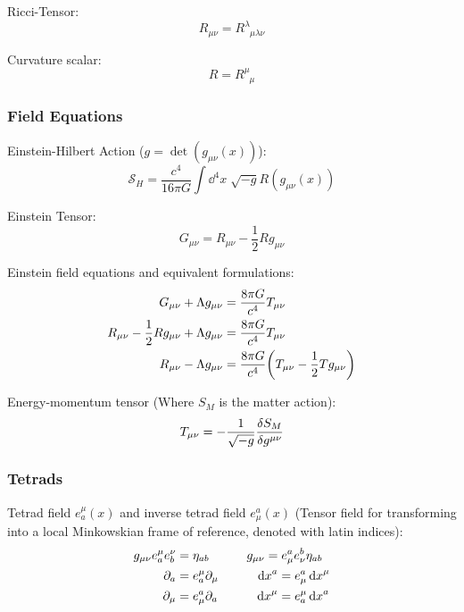 			\noindent
			Ricci-Tensor:
			\begin{equation}
				R_{\mu\nu} = R^\lambda_{\phantom{\lambda}\mu\lambda\nu}
			\end{equation}

			\noindent
			Curvature scalar:
			\begin{equation}
				R = R^\mu_{\phantom{\mu}\mu}
			\end{equation}

		\subsubsection{Field Equations}
			\noindent
			Einstein-Hilbert Action ($g=\det(g_{\mu\nu}(x))$):
			\begin{equation}
				\mathcal{S}_H = \frac{c^4}{16\pi G} \int\dd^4 x\; \sqrt{-g} R(g_{\mu\nu}(x))
			\end{equation}

			\noindent
			Einstein Tensor:
			\begin{equation}
				G_{\mu\nu} = R_{\mu\nu} - \frac{1}{2} R g_{\mu\nu}
			\end{equation}

			\noindent
			Einstein field equations and equivalent formulations:
			\begin{align}
				G_{\mu\nu} + \Lambda g_{\mu\nu} &= \frac{8\pi G}{c^4} T_{\mu\nu} \\
				R_{\mu\nu} - \frac{1}{2} R g_{\mu\nu} + \Lambda g_{\mu\nu} &= \frac{8\pi G}{c^4} T_{\mu\nu} \\
				R_{\mu\nu} - \Lambda g_{\mu\nu}&= \frac{8\pi G}{c^4} \qty( T_{\mu\nu} - \frac{1}{2} T g_{\mu\nu} )
			\end{align}

			\noindent
			Energy-momentum tensor (Where $S_M$ is the matter action):
			\begin{equation}
				T_{\mu\nu} = -\frac{1}{\sqrt{-g}} \fdv{S_M}{g^{\mu\nu}}
			\end{equation}


		\subsubsection{Tetrads}
			Tetrad field $e_a^\mu(x)$ and inverse tetrad field $e_\mu^a(x)$ (Tensor field for transforming into a local Minkowskian frame of reference, denoted with latin indices):
			\begin{equation}
				\begin{aligned}
					g_{\mu\nu} e_a^\mu e_b^\nu &= \eta_{ab}
					\hspace{30pt} g_{\mu\nu} = e^a_\mu e^b_\nu \eta_{ab} \\
					\partial_a &= e_a^\mu \partial_\mu
					\hspace{30pt} \dd{x}^a = e^a_\mu \dd{x}^\mu \\
					\partial_\mu &= e_\mu^a \partial_a
					\hspace{30pt} \dd{x}^\mu = e^\mu_a \dd{x}^a
				\end{aligned}
			\end{equation}

